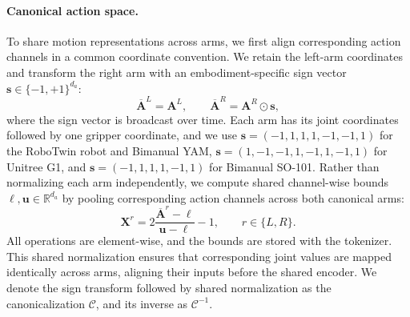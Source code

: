 \paragraph{Canonical action space.}
To share motion representations across arms, we first align corresponding
action channels in a common coordinate convention. We retain the left-arm
coordinates and transform the right arm with an embodiment-specific sign
vector
$\mathbf{s}\in\{-1,+1\}^{d_a}$:
\begin{equation}
    \overline{\mathbf{A}}^{L}=\mathbf{A}^{L},
    \qquad
    \overline{\mathbf{A}}^{R}=\mathbf{A}^{R}\odot\mathbf{s},
    \label{eq:bicat_canonicalization}
\end{equation}
where the sign vector is broadcast over time. Each arm has its joint
coordinates followed by one gripper coordinate, and we use
$\mathbf{s}=(-1,1,1,1,-1,-1,1)$ for the RoboTwin robot and Bimanual YAM,
$\mathbf{s}=(1,-1,-1,1,-1,1,-1,1)$ for Unitree G1, and
$\mathbf{s}=(-1,1,1,1,-1,1)$ for Bimanual SO-101. 
Rather than normalizing each arm independently, we compute shared
channel-wise bounds $\boldsymbol{\ell},\mathbf{u}
\in\mathbb{R}^{d_a}$ by pooling corresponding action channels
across both canonical arms:
\begin{equation}
    \mathbf{X}^{r}
    =2\frac{\overline{\mathbf{A}}^{r}-\boldsymbol{\ell}}
    {\mathbf{u}-\boldsymbol{\ell}}-1,
    \qquad r\in\{L,R\}.
    \label{eq:bicat_normalization}
\end{equation}
All operations are element-wise, and the bounds are stored with the
tokenizer. This shared normalization ensures that corresponding
joint values are mapped identically across arms, aligning their
inputs before the shared encoder. We denote the sign transform followed by
shared normalization as the canonicalization $\mathcal{C}$, and its inverse
as $\mathcal{C}^{-1}$.


